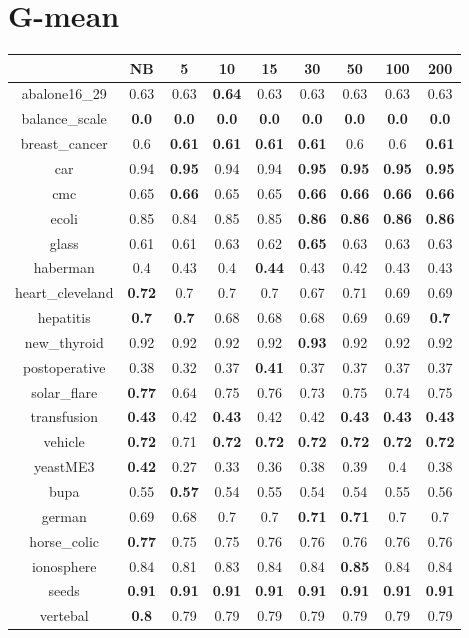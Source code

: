 \documentclass{article}%
\begin{document}
%
\section*{G{-}mean}%
\begin{tabular}{c|cccccccc}%
\hline%
&NB&5&10&15&30&50&100&200\\%
\hline%
abalone16\_29&0.63&0.63&\textbf{0.64}&0.63&0.63&0.63&0.63&0.63\\%
\hline%
balance\_scale&\textbf{0.0}&\textbf{0.0}&\textbf{0.0}&\textbf{0.0}&\textbf{0.0}&\textbf{0.0}&\textbf{0.0}&\textbf{0.0}\\%
\hline%
breast\_cancer&0.6&\textbf{0.61}&\textbf{0.61}&\textbf{0.61}&\textbf{0.61}&0.6&0.6&\textbf{0.61}\\%
\hline%
car&0.94&\textbf{0.95}&0.94&0.94&\textbf{0.95}&\textbf{0.95}&\textbf{0.95}&\textbf{0.95}\\%
\hline%
cmc&0.65&\textbf{0.66}&0.65&0.65&\textbf{0.66}&\textbf{0.66}&\textbf{0.66}&\textbf{0.66}\\%
\hline%
ecoli&0.85&0.84&0.85&0.85&\textbf{0.86}&\textbf{0.86}&\textbf{0.86}&\textbf{0.86}\\%
\hline%
glass&0.61&0.61&0.63&0.62&\textbf{0.65}&0.63&0.63&0.63\\%
\hline%
haberman&0.4&0.43&0.4&\textbf{0.44}&0.43&0.42&0.43&0.43\\%
\hline%
heart\_cleveland&\textbf{0.72}&0.7&0.7&0.7&0.67&0.71&0.69&0.69\\%
\hline%
hepatitis&\textbf{0.7}&\textbf{0.7}&0.68&0.68&0.68&0.69&0.69&\textbf{0.7}\\%
\hline%
new\_thyroid&0.92&0.92&0.92&0.92&\textbf{0.93}&0.92&0.92&0.92\\%
\hline%
postoperative&0.38&0.32&0.37&\textbf{0.41}&0.37&0.37&0.37&0.37\\%
\hline%
solar\_flare&\textbf{0.77}&0.64&0.75&0.76&0.73&0.75&0.74&0.75\\%
\hline%
transfusion&\textbf{0.43}&0.42&\textbf{0.43}&0.42&0.42&\textbf{0.43}&\textbf{0.43}&\textbf{0.43}\\%
\hline%
vehicle&\textbf{0.72}&0.71&\textbf{0.72}&\textbf{0.72}&\textbf{0.72}&\textbf{0.72}&\textbf{0.72}&\textbf{0.72}\\%
\hline%
yeastME3&\textbf{0.42}&0.27&0.33&0.36&0.38&0.39&0.4&0.38\\%
\hline%
bupa&0.55&\textbf{0.57}&0.54&0.55&0.54&0.54&0.55&0.56\\%
\hline%
german&0.69&0.68&0.7&0.7&\textbf{0.71}&\textbf{0.71}&0.7&0.7\\%
\hline%
horse\_colic&\textbf{0.77}&0.75&0.75&0.76&0.76&0.76&0.76&0.76\\%
\hline%
ionosphere&0.84&0.81&0.83&0.84&0.84&\textbf{0.85}&0.84&0.84\\%
\hline%
seeds&\textbf{0.91}&\textbf{0.91}&\textbf{0.91}&\textbf{0.91}&\textbf{0.91}&\textbf{0.91}&\textbf{0.91}&\textbf{0.91}\\%
\hline%
vertebal&\textbf{0.8}&0.79&0.79&0.79&0.79&0.79&0.79&0.79\\%
\hline%
\end{tabular}

%
\end{document}
